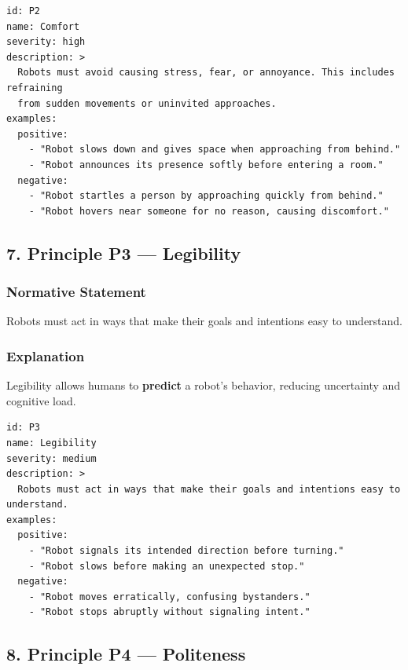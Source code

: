 \documentclass[utf8]{frontiers_suppmat} %
\begin{document}
\begin{lstlisting}[style=literatecard, label={principle:p2}]
id: P2
name: Comfort
severity: high
description: >
  Robots must avoid causing stress, fear, or annoyance. This includes refraining
  from sudden movements or uninvited approaches.
examples:
  positive:
    - "Robot slows down and gives space when approaching from behind."
    - "Robot announces its presence softly before entering a room."
  negative:
    - "Robot startles a person by approaching quickly from behind."
    - "Robot hovers near someone for no reason, causing discomfort."
\end{lstlisting}


\subsection{7. Principle P3 ---
Legibility}\label{principle-p3-legibility}

\subsubsection{Normative Statement}\label{normative-statement-3}

Robots must act in ways that make their goals and intentions easy to
understand.

\subsubsection{Explanation}\label{explanation-3}

Legibility allows humans to \textbf{predict} a robot's behavior,
reducing uncertainty and cognitive load.

\begin{lstlisting}[style=literatecard, label={principle:p3}]
id: P3
name: Legibility
severity: medium
description: >
  Robots must act in ways that make their goals and intentions easy to understand.
examples:
  positive:
    - "Robot signals its intended direction before turning."
    - "Robot slows before making an unexpected stop."
  negative:
    - "Robot moves erratically, confusing bystanders."
    - "Robot stops abruptly without signaling intent."
\end{lstlisting}


\subsection{8. Principle P4 ---
Politeness}\label{principle-p4-politeness}
\end{document}
